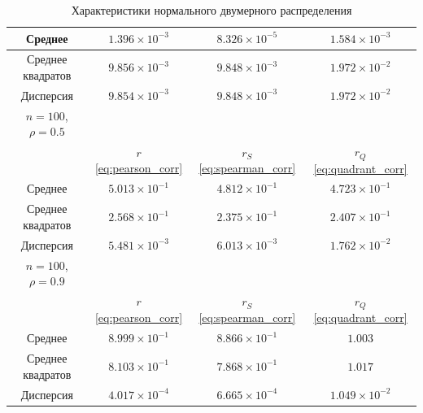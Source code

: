 \documentclass[12pt,a4paper]{article}
\begin{document}
\begin{table}[htbp!]
\begin{tabular}{ |c|c|c|c| }
			\hline
			Среднее & \( 1.396 \times 10^{-3} \) & \( 8.326 \times 10^{-5} \) &
			\( 1.584 \times 10^{-3} \) \\
			\hline
			Среднее квадратов & \( 9.856 \times 10^{-3} \) &
			\( 9.848 \times 10^{-3} \) & \( 1.972 \times 10^{-2} \) \\
			\hline
			Дисперсия & \( 9.854 \times 10^{-3} \) &
			\( 9.848 \times 10^{-3} \) & \( 1.972 \times 10^{-2} \) \\
			\hline
			\hline
			\( n = 100 \), \( \rho = 0.5 \) & & & \\
			\hline
			& \( r \) \eqref{eq:pearson_corr} & \( r_S \) \eqref{eq:spearman_corr} &
			\( r_Q \) \eqref{eq:quadrant_corr} \\
			\hline
			Среднее & \( 5.013 \times 10^{-1} \) & \( 4.812 \times 10^{-1} \) &
			\( 4.723 \times 10^{-1} \) \\
			\hline
			Среднее квадратов & \(2.568 \times 10^{-1} \) &
			\( 2.375 \times 10^{-1} \) & \( 2.407 \times 10^{-1} \) \\
			\hline
			Дисперсия & \( 5.481 \times 10^{-3} \) &
			\( 6.013 \times 10^{-3} \) & \( 1.762 \times 10^{-2} \) \\
			\hline
			\hline
			\( n = 100 \), \( \rho = 0.9 \) & & & \\
			\hline
			& \( r \) \eqref{eq:pearson_corr} & \( r_S \) \eqref{eq:spearman_corr} &
			\( r_Q \) \eqref{eq:quadrant_corr} \\
			\hline
			Среднее & \( 8.999 \times 10^{-1} \) & \( 8.866 \times 10^{-1} \) &
			\( 1.003 \) \\
			\hline
			Среднее квадратов & \(8.103 \times 10^{-1} \) &
			\( 7.868 \times 10^{-1} \) & \( 1.017 \) \\
			\hline
			Дисперсия & \( 4.017 \times 10^{-4} \) &
			\( 6.665 \times 10^{-4} \) & \( 1.049 \times 10^{-2} \) \\
			\hline
		\end{tabular}
		\caption{Характеристики нормального двумерного распределения}
	\end{table}
\end{document}

